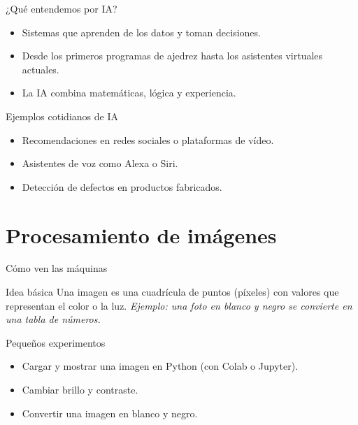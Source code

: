 \documentclass[10pt,aspectratio=169]{beamer}
\begin{document}
\begin{frame}{¿Qué entendemos por IA?}
  \begin{itemize}
    \item Sistemas que aprenden de los datos y toman decisiones.
    \item Desde los primeros programas de ajedrez hasta los asistentes virtuales actuales.
    \item La IA combina matemáticas, lógica y experiencia.
  \end{itemize}
\end{frame}

\begin{frame}{Ejemplos cotidianos de IA}
  \begin{itemize}
    \item Recomendaciones en redes sociales o plataformas de vídeo.
    \item Asistentes de voz como Alexa o Siri.
    \item Detección de defectos en productos fabricados.
  \end{itemize}
\end{frame}

\section{Procesamiento de imágenes}

\begin{frame}{Cómo ven las máquinas}
  \begin{block}{Idea básica}
    Una imagen es una cuadrícula de puntos (píxeles) con valores que representan el color o la luz.\newline
    \textit{Ejemplo: una foto en blanco y negro se convierte en una tabla de números.}
  \end{block}
\end{frame}

\begin{frame}{Pequeños experimentos}
  \begin{itemize}
    \item Cargar y mostrar una imagen en Python (con Colab o Jupyter).
    \item Cambiar brillo y contraste.
    \item Convertir una imagen en blanco y negro.
  \end{itemize}
\end{frame}
\end{document}
